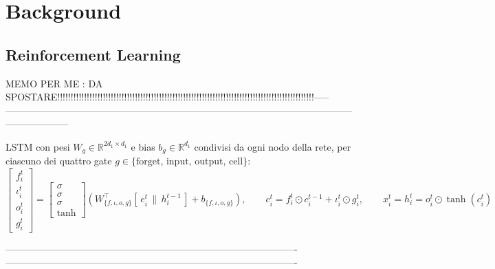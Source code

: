 \chapter{Background}
\label{cap:background}

\section{Reinforcement Learning}
\label{sec:background-rl}


MEMO PER ME : DA SPOSTARE!!!!!!!!!!!!!!!!!!!!!!!!!!!!!!!!!!!!!!!!!!!!!!!!!!!!!!!!!!!!!!!!!!!!!!!!!!!!!!!!!!!!!!!!!!!!!!!!-----
--------------------------------------------------------------------------------------------------------------------------------

LSTM con pesi $W_g \in
\mathbb{R}^{2d_1 \times d_1}$ e bias $b_g \in \mathbb{R}^{d_1}$ condivisi da
ogni nodo della rete, per ciascuno dei quattro gate $g \in \{\text{forget,
input, output, cell}\}$:
\begin{equation}
  \begin{bmatrix} f_i^t \\ \iota_i^t \\ o_i^t \\ g_i^t \end{bmatrix} =
  \begin{bmatrix} \sigma \\ \sigma \\ \sigma \\ \tanh \end{bmatrix}
  \left(
    W_{\{f,\iota,o,g\}}^{\top} [\,e_i^t \,\|\, h_i^{t-1}\,] + b_{\{f,\iota,o,g\}}
  \right), \qquad
  c_i^t = f_i^t \odot c_i^{t-1} + \iota_i^t \odot g_i^t, \qquad
  x_i^t = h_i^t = o_i^t \odot \tanh(c_i^t)
  \label{eq:stgat-lstm}
\end{equation}

-------------------------------------------------------------------------------------------
-------------------------------------------------------------------------------------------





